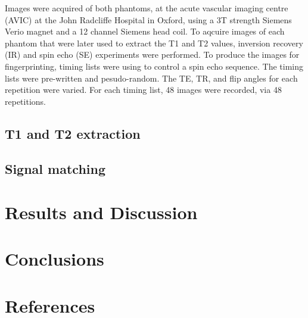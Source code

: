 \documentclass[3p, twocolumn]{elsarticle}
\begin{document}
 Images were acquired of both phantoms, at the acute vascular imaging centre (AVIC) at the John Radcliffe Hospital in Oxford, using a 3T strength Siemens Verio magnet and a 12 channel Siemens head coil. 
To aqcuire images of each phantom that were later used to extract the T1 and T2 values, inversion recovery (IR) and spin echo (SE) experiments were performed.
To produce the images for fingerprinting, timing lists were using to control a spin echo sequence. The timing lists were pre-written and pesudo-random. The TE, TR, and flip angles for each repetition were varied. For each timing list, 48 images were recorded, via 48 repetitions. 


\subsection{T1 and T2 extraction}


\subsection{Signal matching}



\section{Results and Discussion}

\section{Conclusions}

\section*{References}


\end{document}

